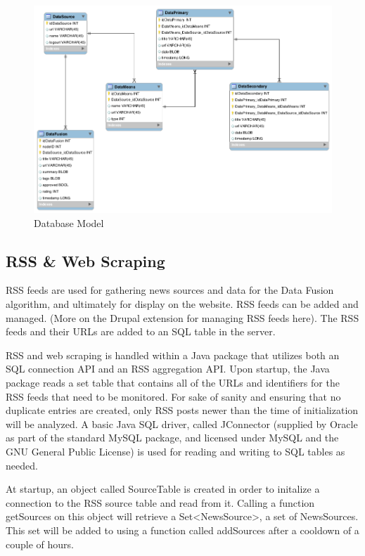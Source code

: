 \documentclass[12pt]{article} %
\begin{document}
\begin{figure}[htbp]
\begin{center}
\includegraphics[width=6in]{images/database_model}
\caption{Database Model}
\end{center}
\end{figure}

\subsection{RSS \& Web Scraping}

RSS feeds are used for gathering news sources and data for the Data Fusion algorithm, and ultimately for display on the website. RSS feeds can be added and managed. (More on the Drupal extension for managing RSS feeds here). The RSS feeds and their URLs are added to an SQL table in the server.

RSS and web scraping is handled within a Java package that utilizes both an SQL
connection API and an RSS aggregation API. Upon startup, the Java package reads a
set table that contains all of the URLs and identifiers for the RSS feeds that need to be
monitored. For sake of sanity and ensuring that no duplicate entries are created, only
RSS posts newer than the time of initialization will be analyzed. A basic Java SQL driver,
called JConnector (supplied by Oracle as part of the standard MySQL package, and licensed
under MySQL and the GNU General Public License) is used for reading and writing to SQL
tables as needed.

At startup, an object called SourceTable is created in order to initalize a connection
to the RSS source table and read from it. Calling a function getSources on this object
will retrieve a Set<NewsSource>, a set of NewsSources. This set will be added to using
a function called addSources after a cooldown of a couple of hours.
\end{document}
